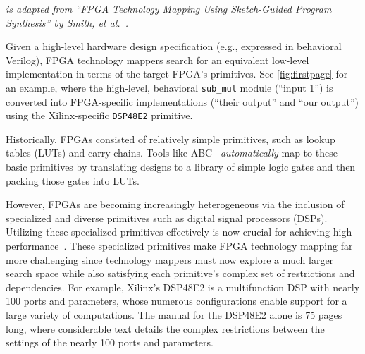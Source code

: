 

\textit{ is adapted from 
``FPGA Technology Mapping Using Sketch-Guided Program Synthesis'' by Smith, et al.~\cite{smith2024fpga}.
}

\vspace{10mm}

\noindent
Given a high-level hardware design specification
  (e.g., expressed in behavioral Verilog),
  FPGA technology mappers
  search for an equivalent
  low-level implementation
  in terms of the target FPGA's
  primitives.
See \cref{fig:firstpage} for an example, where
the high-level, behavioral \texttt{sub\_mul}
  module (``input 1'')
  is converted into FPGA-specific implementations
  (``their output'' and ``our output'')
  using the Xilinx-specific
  \texttt{DSP48E2} primitive.
  
Historically,
  FPGAs consisted of relatively simple
  primitives, such as
  lookup tables (LUTs) and carry chains.
Tools like
  ABC~\cite{ABC,abc2,brayton2010abc}
  \textit{automatically} 
  map to these basic primitives
  by translating designs
  to a library of simple logic gates
  and then packing those gates
  into LUTs.

However, FPGAs are becoming
  increasingly heterogeneous
  via
  the inclusion of specialized and diverse primitives
  such as digital signal processors (DSPs).
Utilizing these specialized primitives
  effectively
  is now
  crucial for achieving
  high performance~\cite{vega2021reticle}.
These specialized primitives
  make FPGA technology mapping far more challenging
  since technology mappers must now
  explore a much larger search space
  while also satisfying each primitive's
  complex set of restrictions and dependencies.
For example, Xilinx's DSP48E2
  is a multifunction 
  DSP
  with nearly
  100 ports and parameters,
  whose numerous configurations
  enable 
  support for a large variety of computations.
The manual for the DSP48E2 alone
  is 75 pages long,
  where considerable text details
  the complex restrictions
  between the settings of the nearly 100
  ports and parameters.

